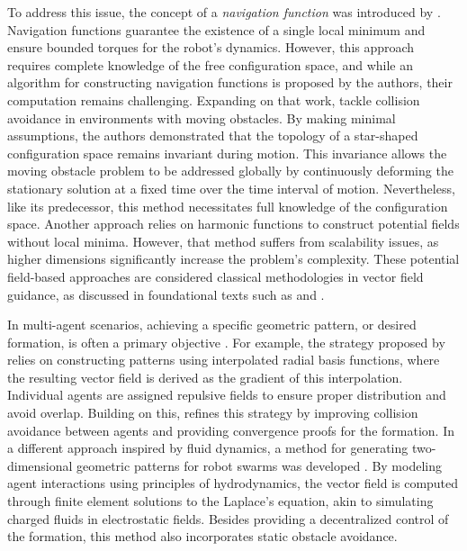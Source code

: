 To address this issue, the concept of a \emph{navigation function} was introduced by \citet{Rimon1992}. Navigation functions guarantee the existence of a single local minimum and ensure bounded torques for the robot's dynamics. However, this approach requires complete knowledge of the free configuration space, and while an algorithm for constructing navigation functions is proposed by the authors, their computation remains challenging. Expanding on that work, \citet{Conn1998} tackle collision avoidance in environments with moving obstacles. By making minimal assumptions, the authors demonstrated that the topology of a star-shaped configuration space remains invariant during motion. This invariance allows the moving obstacle problem to be addressed globally by continuously deforming the stationary solution at a fixed time over the time interval of motion. Nevertheless, like its predecessor, this method necessitates full knowledge of the configuration space. Another approach \citep{Pimenta2006} relies on harmonic functions to construct potential fields without local minima. However, that method suffers from scalability issues, as higher dimensions significantly increase the problem's complexity. These potential field-based approaches are considered classical methodologies in vector field guidance, as discussed in foundational texts such as \citet[p. 77]{Choset2005} and \citet[p. 299]{Spong2020}.

In multi-agent scenarios, achieving a specific geometric pattern, or desired formation, is often a primary objective \citep{Chaimowicz2005,Mong-yingA.Hsieh2006,Pimenta2007}. For example, the strategy proposed by \citet{Chaimowicz2005} relies on constructing patterns using interpolated radial basis functions, where the resulting vector field is derived as the gradient of this interpolation. Individual agents are assigned repulsive fields to ensure proper distribution and avoid overlap. Building on this, \citet{Mong-yingA.Hsieh2006} refines this strategy by improving collision avoidance between agents and providing convergence proofs for the formation. In a different approach inspired by fluid dynamics, a method for generating two-dimensional geometric patterns for robot swarms was developed \citep{Pimenta2007}. By modeling agent interactions using principles of hydrodynamics, the vector field is computed through finite element solutions to the Laplace's equation, akin to simulating charged fluids in electrostatic fields. Besides providing a decentralized control of the formation, this method also incorporates static obstacle avoidance.

